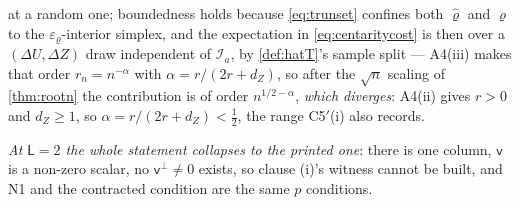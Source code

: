 \begin{corollary}
\begin{enumerate}
{at a random one}; boundedness holds because \eqref{eq:trunset} confines both $\hat\varrho$ and $\varrho$
to the $\varepsilon_\varrho$-interior simplex, and the expectation in \eqref{eq:centaritycost} is then
over a $(\Delta U,\Delta Z)$ draw independent of $\mathcal I_a$, by \cref{def:hatT}'s sample
split --- A4(iii) makes that order $r_n=n^{-\alpha}$ with
$\alpha=r/(2r+d_Z)$, so after the $\sqrt n$ scaling of \cref{thm:rootn} the contribution is of order
$n^{1/2-\alpha}$, \emph{which diverges}: A4(ii) gives $r>0$ and $d_Z\ge1$, so
$\alpha=r/(2r+d_Z)<\tfrac12$, the range C5$'$(i) also records.
\end{enumerate}
\emph{At $\mathsf L=2$ the whole statement collapses to the printed one}: there is one column,
$\mathsf v$ is a non-zero scalar, no $\mathsf v^{\perp}\ne0$ exists, so clause \textup{(i)}'s witness
cannot be built, and N1 and the contracted condition are the same $p$ conditions.
\end{corollary}

